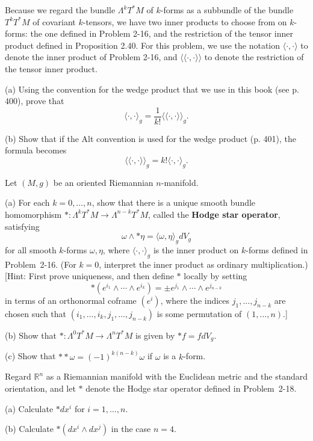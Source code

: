 \begin{exercise}
\label{prob:inner-products-k-forms}
Because we regard the bundle $\Lambda^k T^* M$ of $k$-forms as a subbundle of the bundle $T^k T^* M$ of covariant $k$-tensors, we have two inner products to choose from on $k$-forms: the one defined in Problem 2-16, and the restriction of the tensor inner product defined in Proposition 2.40. For this problem, we use the notation $\langle \cdot, \cdot \rangle$ to denote the inner product of Problem 2-16, and $\langle\langle \cdot, \cdot \rangle\rangle$ to denote the restriction of the tensor inner product.

(a) Using the convention for the wedge product that we use in this book (see p. 400), prove that
\[
\langle \cdot, \cdot \rangle_g = \frac{1}{k!} \langle\langle \cdot, \cdot \rangle\rangle_g.
\]

(b) Show that if the Alt convention is used for the wedge product (p. 401), the formula becomes
\[
\langle\langle \cdot, \cdot \rangle\rangle_g = k! \langle \cdot, \cdot \rangle_g.
\]
\end{exercise}

\begin{exercise}\label{prob:hodge-star-operator}
Let $(M,g)$ be an oriented Riemannian $n$-manifold.

(a) For each $k = 0, \ldots, n$, show that there is a unique smooth bundle homomorphism $*: \Lambda^k T^* M \to \Lambda^{n-k}T^*M$, called the \textbf{Hodge star operator}, satisfying
\[
\omega \wedge *\eta = \langle\omega,\eta\rangle_g dV_g
\]
for all smooth $k$-forms $\omega, \eta$, where $\langle\cdot,\cdot\rangle_g$ is the inner product on $k$-forms defined in Problem~2-16. (For $k = 0$, interpret the inner product as ordinary multiplication.) [Hint: First prove uniqueness, and then define $*$ locally by setting
\[
*(e^{i_1} \wedge \cdots \wedge e^{i_k}) = \pm e^{j_1} \wedge \cdots \wedge e^{j_{n-k}}
\]
in terms of an orthonormal coframe $(e^i)$, where the indices $j_1,\ldots,j_{n-k}$ are chosen such that $(i_1,\ldots,i_k,j_1,\ldots,j_{n-k})$ is some permutation of $(1,\ldots,n)$.]

(b) Show that $*: \Lambda^0 T^*M \to \Lambda^n T^*M$ is given by $*f = f dV_g$.

(c) Show that $* * \omega = (-1)^{k(n-k)}\omega$ if $\omega$ is a $k$-form.
\end{exercise}

\begin{exercise}\label{prob:hodge-star-euclidean}
Regard $\mathbb{R}^n$ as a Riemannian manifold with the Euclidean metric and the standard orientation, and let $*$ denote the Hodge star operator defined in Problem~2-18.

(a) Calculate $* dx^i$ for $i = 1, \ldots, n$.

(b) Calculate $*(dx^i \wedge dx^j)$ in the case $n = 4$.
\end{exercise}

